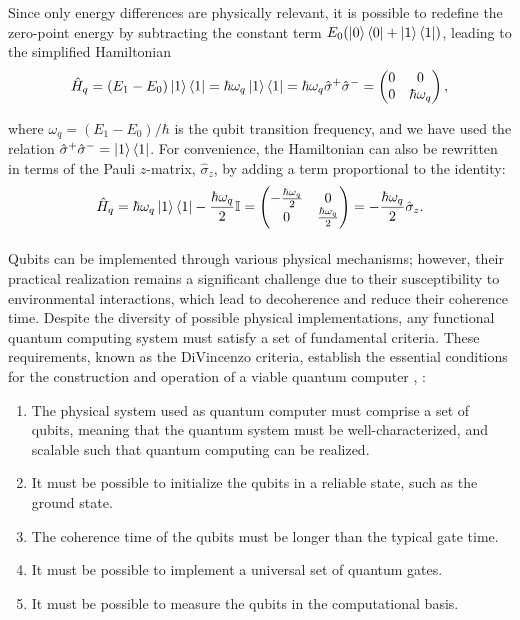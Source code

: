 Since only energy differences are physically relevant, it is possible to redefine the zero-point energy by subtracting the constant term $E_0 (\ket{0} \bra{0} + \ket{1} \bra{1})$, leading to the simplified Hamiltonian
\begin{equation}\label{eq:qubithamiltonian}
    \hat{H}_q = (E_1 - E_0) \ket{1} \bra{1} = \hbar \omega_q \ket{1} \bra{1} = \hbar \omega_q \hat{\sigma}^{+} \hat{\sigma}^{-} = 
    \begin{pmatrix}
        0 & 0 \\
        0 & \hbar \omega_q
    \end{pmatrix},
\end{equation}

where $\omega_q = (E_1 - E_0)/\hbar$ is the qubit transition frequency, and we have used the relation $\hat{\sigma}^{+} \hat{\sigma}^{-} = \ket{1} \bra{1}$.
For convenience, the Hamiltonian can also be rewritten in terms of the Pauli $z$-matrix, $\hat{\sigma}_z$, by adding a term proportional to the identity:
\begin{equation}
    \hat{H}_q = \hbar \omega_q \ket{1} \bra{1} - \frac{\hbar \omega_q}{2}\mathbb{I} = 
    \begin{pmatrix}
        -\frac{\hbar \omega_q}{2} & 0 \\
        0 & \frac{\hbar \omega_q}{2}
    \end{pmatrix} = -\frac{\hbar \omega_q}{2} \hat{\sigma}_z.
\end{equation}

\paragraph{}
Qubits can be implemented through various physical mechanisms; however, their practical realization remains a significant challenge due to their susceptibility to environmental interactions, which lead to decoherence and reduce their coherence time. 
Despite the diversity of possible physical implementations, any functional quantum computing system must satisfy a set of fundamental criteria. 
These requirements, known as the DiVincenzo criteria, establish the essential conditions for the construction and operation of a viable quantum computer \cite{DiVincenzo_2000}, \cite{manenti_quantum_2023}:
\begin{enumerate}
    \item The physical system used as quantum computer must comprise a set of qubits, meaning that the quantum system must be well-characterized, and scalable such that quantum
    computing can be realized.
    \item It must be possible to initialize the qubits in a reliable state, such as the ground state.
    \item The coherence time of the qubits must be longer than the typical gate time.
    \item It must be possible to implement a universal set of quantum gates.
    \item It must be possible to measure the qubits in the computational basis.
\end{enumerate}

